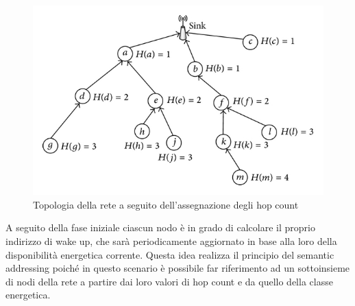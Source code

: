 \documentclass{report}
\begin{document}
\begin{figure}
    \begin{center}
        \includegraphics[scale=1.7]{hop-count-algorithm.png}
        \caption{Topologia della rete a seguito dell'assegnazione degli hop count}
    \end{center}
\end{figure}

A seguito della fase iniziale ciascun nodo è in grado di calcolare il proprio indirizzo di wake up, che sarà periodicamente aggiornato in base alla loro
della disponibilità energetica corrente. Questa idea realizza il principio del semantic addressing poiché in questo scenario
è possibile far riferimento ad un sottoinsieme di nodi della rete a partire dai loro valori di hop count e da quello della classe energetica.\\
\end{document}
